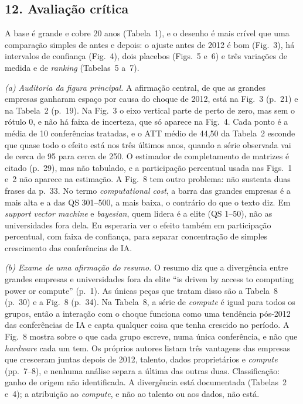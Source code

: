 \subsection*{12. Avaliação crítica}
A base é grande e cobre 20 anos (Tabela~1), e o desenho é mais crível que uma comparação simples de
antes e depois: o ajuste antes de 2012 é bom (Fig.~3), há intervalos de confiança (Fig.~4), dois
placebos (Figs.~5 e~6) e três variações de medida e de \emph{ranking} (Tabelas~5 a~7).

\textit{(a) Auditoria da figura principal.} A afirmação central, de que as grandes empresas ganharam
espaço por causa do choque de 2012, está na Fig.~3 (p.~21) e na Tabela~2 (p.~19). Na Fig.~3 o eixo
vertical parte de perto de zero, mas sem o rótulo 0, e não há faixa de incerteza, que só aparece na
Fig.~4. Cada ponto é a média de 10 conferências tratadas, e o ATT médio de 44,50 da Tabela~2 esconde
que quase todo o efeito está nos três últimos anos, quando a série observada vai de cerca de 95
para cerca de 250. O estimador de completamento de matrizes é citado (p.~29), mas não tabulado, e a
participação percentual usada nas Figs.~1 e~2 não aparece na estimação. A Fig.~8 tem outro
problema: não sustenta duas frases da p.~33. No termo \emph{computational cost}, a barra das grandes
empresas é a mais alta e a das QS 301--500, a mais baixa, o contrário do que o texto diz. Em
\emph{support vector machine} e \emph{bayesian}, quem lidera é a elite (QS 1--50), não as
universidades fora dela. Eu esperaria ver o efeito também em participação percentual, com faixa de
confiança, para separar concentração de simples crescimento das conferências de IA.

\textit{(b) Exame de uma afirmação do resumo.} O resumo diz que a divergência entre grandes empresas
e universidades fora da elite ``is driven by access to computing power or compute'' (p.~1). As
únicas peças que tratam disso são a Tabela~8 (p.~30) e a Fig.~8 (p.~34). Na Tabela~8, a série de
\emph{compute} é igual para todos os grupos, então a interação com o choque funciona como uma
tendência pós-2012 das conferências de IA e capta qualquer coisa que tenha crescido no período. A
Fig.~8 mostra sobre o que cada grupo escreve, numa única conferência, e não que \emph{hardware} cada
um tem. Os próprios autores listam três vantagens das empresas que cresceram juntas depois de 2012,
talento, dados proprietários e \emph{compute} (pp.~7--8), e nenhuma análise separa a última das
outras duas. Classificação: ganho de origem não identificada. A divergência está documentada
(Tabelas~2 e~4); a atribuição ao \emph{compute}, e não ao talento ou aos dados, não está.
